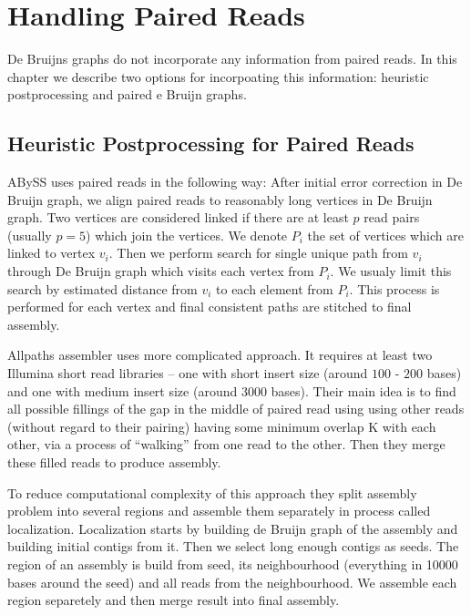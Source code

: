 \section{Handling Paired Reads}

De Bruijns graphs do not incorporate any information from paired reads.
In this chapter we describe two options for incorpoating this information:
heuristic postprocessing and paired e Bruijn graphs.

\subsection{Heuristic Postprocessing for Paired Reads}

ABySS \citep{Abyss} uses paired reads in the following way:
After initial error correction in De Bruijn graph, we align paired reads
to reasonably long vertices in De Bruijn graph. Two vertices are considered linked
if there are at least $p$ read pairs (usually $p=5$) which join the vertices.
We denote $P_i$ the set of vertices which are linked to vertex $v_i$.
Then we perform search for single unique path from $v_i$ through De Bruijn graph which visits
each vertex from $P_i$. We usualy limit this search by estimated distance from $v_i$ to each element
from $P_i$. This process is performed for each vertex and final consistent paths
are stitched to final assembly.

Allpaths assembler \citep{allpaths} uses more complicated approach.
It requires at least two Illumina short read libraries -- one with short insert size
(around $100$ - $200$ bases) and one with medium insert size (around $3000$ bases).
Their main idea is to find all possible fillings of the gap in the middle of paired read
using using other reads (without regard to their pairing)
having some minimum overlap K with each other, via a process of “walking” from
one read to the other. Then they merge these filled reads to produce assembly. 

To reduce computational complexity of this approach they split assembly problem
into several regions and assemble them separately in process called localization.
Localization starts by building de Bruijn graph of the assembly and building initial
contigs from it. Then we select long enough contigs as seeds. 
The region of an assembly is build from seed, its neighbourhood (everything
in 10000 bases around the seed) and all reads from the neighbourhood.
We assemble each region separetely and then merge result into final assembly.

